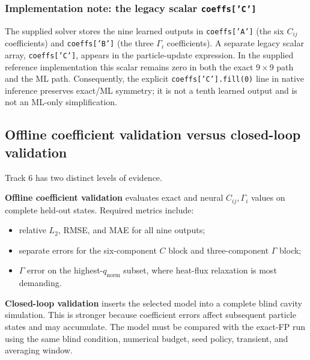 \documentclass[11pt]{article}
\begin{document}
\subsubsection*{Implementation note: the legacy scalar \texttt{coeffs['C']}}
The supplied solver stores the nine learned outputs in \texttt{coeffs['A']} (the six $C_{ij}$ coefficients) and \texttt{coeffs['B']} (the three $\Gamma_i$ coefficients). A separate legacy scalar array, \texttt{coeffs['C']}, appears in the particle-update expression. In the supplied reference implementation this scalar remains zero in both the exact $9\times9$ path and the ML path. Consequently, the explicit \texttt{coeffs['C'].fill(0)} line in native inference preserves exact/ML symmetry; it is not a tenth learned output and is not an ML-only simplification.

\subsection{Offline coefficient validation versus closed-loop validation}
Track 6 has two distinct levels of evidence.

\textbf{Offline coefficient validation} evaluates exact and neural $C_{ij},\Gamma_i$ values on complete held-out states. Required metrics include:
\begin{itemize}
\item relative $L_2$, RMSE, and MAE for all nine outputs;
\item separate errors for the six-component $C$ block and three-component $\Gamma$ block;
\item $\Gamma$ error on the highest-$q_{\mathrm{norm}}$ subset, where heat-flux relaxation is most demanding.
\end{itemize}

\textbf{Closed-loop validation} inserts the selected model into a complete blind cavity simulation. This is stronger because coefficient errors affect subsequent particle states and may accumulate. The model must be compared with the exact-FP run using the same blind condition, numerical budget, seed policy, transient, and averaging window.
\end{document}

